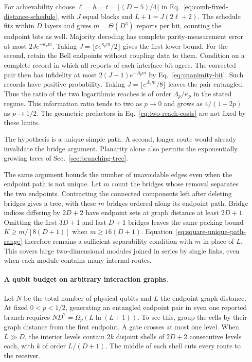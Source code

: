 \documentclass[aps,prl,twocolumn,superscriptaddress,longbibliography,reprint,floatfix]{revtex4-2}
\newcommand{\eps}{\varepsilon}
\begin{document}
For achievability choose $\ell=h=t=\lfloor(D-5)/4\rfloor$ in
Eq.~\eqref{eq:comb-fixed-distance-schedule}, with $J$ equal blocks
and $L+1=J(2\ell+2)$. The schedule fits within $D$ layers and gives
$m=\Theta(D^3)$ reports per bit, counting the endpoint bits as well.
Majority decoding has complete parity-measurement error at most
$2Je^{-\kappa_p m}$. Taking $J=\lfloor\eps e^{\kappa_p m}/2\rfloor$
gives the first lower bound. For the second, retain the Bell endpoints
without coupling data to them. Condition on a complete record in which
all reports of each interface bit agree. The corrected pair then
has infidelity at most $2(J-1)e^{-\Lambda_p m}$ by
Eq.~\eqref{eq:unanimity-bit}. Such records have positive probability.
Taking $J=\lfloor e^{\Lambda_p m}/8\rfloor$ leaves the pair entangled.
Thus the ratio of the two logarithmic reaches is of order
$\Lambda_p/\kappa_p$ in the stated regime. This information ratio tends
to two as $p\to0$ and grows as $4/(1-2p)$ as $p\to1/2$. The geometric
prefactors in Eq.~\eqref{eq:two-reach-costs} are not fixed by these limits.

The hypothesis is a unique simple path. A second, longer route would
already invalidate the bridge argument. Planarity alone also permits
the exponentially growing trees of Sec.~\ref{sec:branching-tree}.

The same argument bounds the number of unavoidable edges even when
the endpoint path is not unique. Let $m$ count the bridges whose
removal separates the two endpoints. Contracting the connected
components left after deleting bridges gives a tree, with these $m$
bridges ordered along its endpoint path. Bridge indices differing by
$2D+2$ have endpoint sets at graph distance at least $2D+1$.
Omitting the first $3D+1$ and last $D+1$ bridges leaves the same
packing bound $K\ge m/[8(D+1)]$ when $m\ge16(D+1)$.
Equation~\eqref{eq:square-unique-path-range} therefore remains a
sufficient separability condition with $m$ in place of $L$.
This covers large two-dimensional modules joined in series by single
links, even when each module contains many internal routes.

\paragraph*{A qubit budget on arbitrary interaction graphs.}
Let $N$ be the total number of physical qubits and $L$ the endpoint graph distance.
At fixed $0<p<1/2$, generating an entangled endpoint pair in even one
reported branch requires $ND^2=\Omega_p(L\ln(L+1))$. To see this, group
the cells by their graph distance from the first endpoint. A gate crosses
at most one level. When $L\gg D$, the interior levels contain $2k$
disjoint shells of $2D+2$ consecutive levels each, with $k$ of order
$L/(D+1)$. The middle of each shell cuts every route to the receiver.
\end{document}
